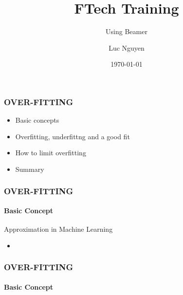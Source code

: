 \documentclass[11pt]{beamer}
\title{FTech Training}
\subtitle{Using Beamer}
\author{Luc Nguyen}
\institute{HUST}
\date{\today}
\begin{document}
\begin{frame}
	\frametitle{\textbf{OVER-FITTING}}
	\begin{itemize}
		\item Basic concepts
		\item Overfitting, underfittng and a good fit
		\item How to limit overfitting
		\item Summary
	\end{itemize}
\end{frame}
\begin{frame}
	\frametitle{\textbf{OVER-FITTING}}
	\framesubtitle{Basic Concept}
	\Large{Approximation in Machine Learning}
	\begin{itemize}
		\item 
	\end{itemize}
\end{frame}
\begin{frame}
	\frametitle{\textbf{OVER-FITTING}}
	\framesubtitle{Basic Concept}
	
\end{frame}
\iffalse

\begin{frame}
    \begin{itemize}
        \item<1> First
        \item<1-2> Second
        \item<1> Third
    \end{itemize}
\end{frame}

\fi
\end{document}
